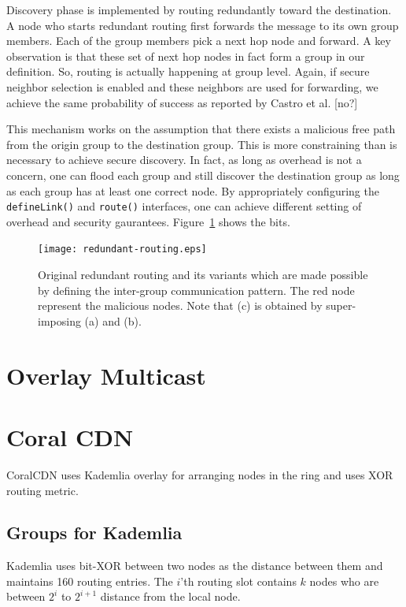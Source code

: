 Discovery phase is implemented by routing redundantly toward the destination. A node who starts redundant routing first forwards the message to its own group members. Each of the group members pick a next hop node and forward. A key observation is that these set of next hop nodes in fact form a group in our definition. So, routing is actually happening at group level. Again, if secure neighbor selection is enabled and these neighbors are used for forwarding, we achieve the same probability of success as reported by Castro et al. [no?]

 This mechanism works on the assumption that there exists a malicious free path from the origin group to the destination group. This is more constraining than is necessary to achieve secure discovery. In fact, as long as overhead is not a concern, one can flood each group and still discover the destination group as long as each group has at least one correct node. By appropriately configuring the \texttt{defineLink()} and \texttt{route()} interfaces, one can achieve different setting of overhead and security gaurantees. Figure~\ref{fig:redundant-routing} shows the bits.

\begin{figure} 
\begin{center} 
\texttt{[image: redundant-routing.eps]} 
\end{center} 
\caption{Original redundant routing and its variants which are made possible by defining the inter-group communication pattern. The red node represent the malicious nodes. Note that (c) is obtained by super-imposing (a) and (b).} 
\label{fig:redundant-routing} 
\end{figure} 


\section{Overlay Multicast}

\section{Coral CDN}
CoralCDN uses Kademlia overlay for arranging nodes in the ring and uses XOR routing metric. 

\subsection{Groups for Kademlia}
Kademlia uses bit-XOR between two nodes as the distance between them and maintains 160 routing entries. The $i$'th routing slot contains $k$ nodes who are between $2^i$ to $2^{i+1}$ distance from the local node. 

